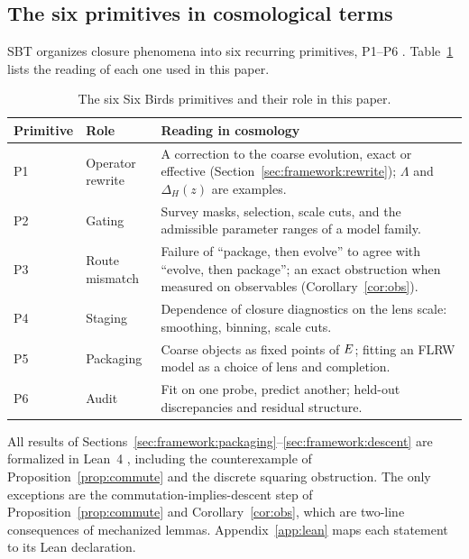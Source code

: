 \documentclass[11pt]{article}
\theoremstyle{plain}
\theoremstyle{definition}
\theoremstyle{remark}
\begin{document}
\subsection{The six primitives in cosmological terms}\label{sec:framework:p1p6}

SBT organizes closure phenomena into six recurring primitives, P1--P6 \cite{Tsiokos2026SixBirds}. Table~\ref{tab:p1p6_map} lists the reading of each one used in this paper.

\begin{table}[t]
\centering
\small
\caption{The six Six Birds primitives and their role in this paper.}
\label{tab:p1p6_map}
\begin{tabularx}{\linewidth}{@{}l l >{\raggedright\arraybackslash}X@{}}
\toprule
Primitive & Role & Reading in cosmology \\
\midrule
P1 & Operator rewrite & A correction to the coarse evolution, exact or effective (Section~\ref{sec:framework:rewrite}); $\Lambda$ and $\Delta_H(z)$ are examples. \\
P2 & Gating & Survey masks, selection, scale cuts, and the admissible parameter ranges of a model family. \\
P3 & Route mismatch & Failure of ``package, then evolve'' to agree with ``evolve, then package''; an exact obstruction when measured on observables (Corollary~\ref{cor:obs}). \\
P4 & Staging & Dependence of closure diagnostics on the lens scale: smoothing, binning, scale cuts. \\
P5 & Packaging & Coarse objects as fixed points of $E$; fitting an FLRW model as a choice of lens and completion. \\
P6 & Audit & Fit on one probe, predict another; held-out discrepancies and residual structure. \\
\bottomrule
\end{tabularx}
\end{table}

All results of Sections~\ref{sec:framework:packaging}--\ref{sec:framework:descent} are formalized in Lean~4 \cite{Moura2021Lean4}, including the counterexample of Proposition~\ref{prop:commute} and the discrete squaring obstruction. The only exceptions are the commutation-implies-descent step of Proposition~\ref{prop:commute} and Corollary~\ref{cor:obs}, which are two-line consequences of mechanized lemmas. Appendix~\ref{app:lean} maps each statement to its Lean declaration.

\end{document}
